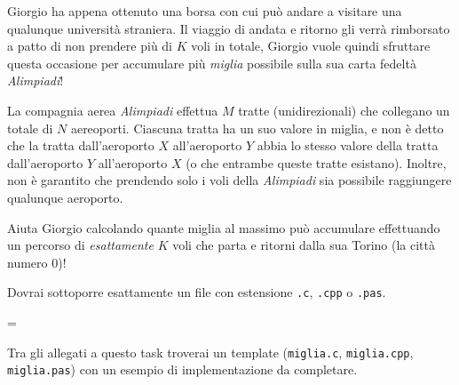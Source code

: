 \usepackage{xcolor}
\usepackage{afterpage}
\usepackage{pifont,mdframed}
\usepackage[bottom]{footmisc}

\makeatletter
\gdef\this@inputfilename{input.txt}
\gdef\this@outputfilename{output.txt}
\makeatother

\newcommand{\inputfile}{\texttt{input.txt}}
\newcommand{\outputfile}{\texttt{output.txt}}

\newenvironment{warning}
  {\par\begin{mdframed}[linewidth=2pt,linecolor=gray]%
    \begin{list}{}{\leftmargin=1cm
                   \labelwidth=\leftmargin}\item[\Large\ding{43}]}
  {\end{list}\end{mdframed}\par}

	Giorgio ha appena ottenuto una borsa con cui pu\`o andare a visitare una qualunque universit\`a straniera. Il viaggio di andata e ritorno gli verr\`a rimborsato a patto di non prendere pi\`u di $K$ voli in totale, Giorgio vuole quindi sfruttare questa occasione per accumulare pi\`u \emph{miglia} possibile sulla sua carta fedelt\`a \emph{Alimpiadi}!
	
	La compagnia aerea \emph{Alimpiadi} effettua $M$ tratte (unidirezionali) che collegano un totale di $N$ aereoporti. Ciascuna tratta ha un suo valore in miglia, e non \`e detto che la tratta dall'aeroporto $X$ all'aeroporto $Y$ abbia lo stesso valore della tratta dall'aeroporto $Y$ all'aeroporto $X$ (o che entrambe queste tratte esistano). Inoltre, non \`e garantito che prendendo solo i voli della \emph{Alimpiadi} sia possibile raggiungere qualunque aeroporto.
	
	Aiuta Giorgio calcolando quante miglia al massimo pu\`o accumulare effettuando un percorso di \emph{esattamente} $K$ voli che parta e ritorni dalla sua Torino (la citt\`a numero $0$)!

\Implementation
Dovrai sottoporre esattamente un file con estensione \texttt{.c}, \texttt{.cpp} o \texttt{.pas}.

\begin{warning}
Tra gli allegati a questo task troverai un template (\texttt{miglia.c}, \texttt{miglia.cpp}, \texttt{miglia.pas}) con un esempio di implementazione da completare.
\end{warning}

